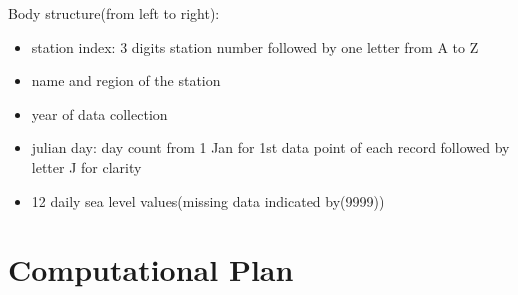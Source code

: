 \documentclass[fontsize=11pt]{article}
\begin{document}
Body structure(from left to right):
\begin{itemize}
    \item
    station index: 3 digits station number followed by one letter from A to Z
    \item
    name and region of the station
    \item
    year of data collection 
    \item
    julian day: day count from 1 Jan for 1st data point of each record followed by letter J for clarity
    \item
    12 daily sea level values(missing data indicated by(9999))
\end{itemize}


\section*{Computational Plan}
\end{document}

